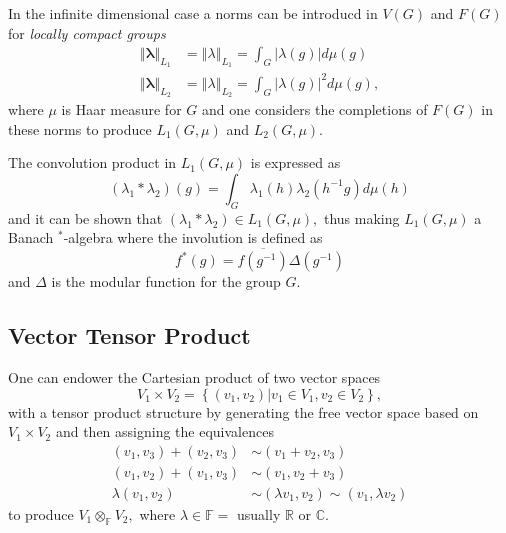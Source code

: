 \documentclass[aps,preprint]{revtex4}
\begin{document}
In the infinite dimensional case a norms can be introducd in $V\left(
G\right) $ and $F\left( G\right) $ for \emph{locally compact groups} 
\begin{align}
\left\Vert \mathbf{\lambda}\right\Vert _{L_{1}} & =\left\Vert \mathbb{\lambda%
}\right\Vert _{L_{1}}=\int_{G}\left\vert \mathbb{\lambda }\left( g\right)
\right\vert d\mu\left( g\right) \\
\left\Vert \mathbf{\lambda}\right\Vert _{L_{2}} & =\left\Vert \mathbb{\lambda%
}\right\Vert _{L_{2}}=\int_{G}\left\vert \mathbb{\lambda }\left( g\right)
\right\vert ^{2}d\mu\left( g\right) ,
\end{align}
where $\mu$ is Haar measure for $G$ and one considers the completions of $%
F\left( G\right) $ in these norms to produce $L_{1}\left( G,\mu\right) $ and 
$L_{2}\left( G,\mu\right) .$

The convolution product in $L_{1}\left( G,\mu\right) $ is expressed as 
\begin{equation}
\left( \lambda_{1}\ast\lambda_{2}\right) \left( g\right)
=\int_{G}\lambda_{1}\left( h\right) \lambda_{2}\left( h^{-1}g\right)
d\mu\left( h\right)
\end{equation}
and it can be shown that $\left( \lambda_{1}\ast\lambda_{2}\right) \in
L_{1}\left( G,\mu\right) ,$ thus making $L_{1}\left( G,\mu\right) $ a Banach 
$^{\ast}$-algebra where the involution is defined as 
\begin{equation}
f^{\ast}\left( g\right) =\overline{f\left( g^{-1}\right) }\Delta\left(
g^{-1}\right)
\end{equation}
and $\Delta$ is the modular function for the group $G.$

\subsection{Vector Tensor Product}

One can endower the Cartesian product of two vector spaces 
\begin{equation}
V_{1}\times V_{2}=\left\{ \left. \left( v_{1},v_{2}\right) \right\vert
v_{1}\in V_{1},v_{2}\in V_{2}\right\} ,
\end{equation}
with a tensor product structure by generating the free vector space based on 
$V_{1}\times V_{2}$ and then assigning the equivalences 
\begin{align}
\left( v_{1},v_{3}\right) +\left( v_{2},v_{3}\right) & \sim\left(
v_{1}+v_{2},v_{3}\right) \\
\left( v_{1},v_{2}\right) +\left( v_{1},v_{3}\right) & \sim\left(
v_{1},v_{2}+v_{3}\right) \\
\lambda\left( v_{1},v_{2}\right) & \sim\left( \lambda v_{1},v_{2}\right)
\sim\left( v_{1},\lambda v_{2}\right)
\end{align}
to produce $V_{1}\otimes_{\mathbb{F}}V_{2},$ where $\lambda\in\mathbb{F=}$
usually $\mathbb{R}$ or $\mathbb{C}.$
\end{document}
